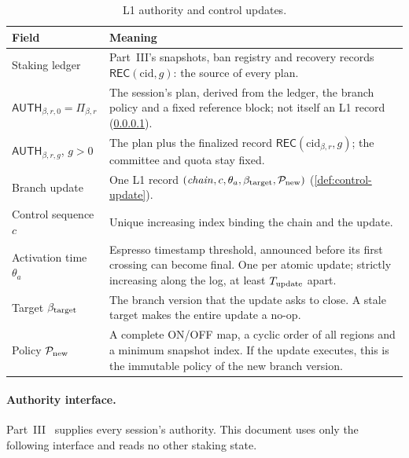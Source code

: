 \documentclass[11pt,a4paper]{article}
\newcommand{\tagg}[1]{\ensuremath{\mathsf{#1}}}
\begin{document}
\begin{table}[htbp]\centering\small
\caption{L1 authority and control updates.}\label{tab:l1}
\begin{tabularx}{\linewidth}{@{}p{.27\linewidth}Y@{}}\toprule
Field & Meaning\\\midrule
Staking ledger & Part~III's snapshots, ban registry and recovery records
$\tagg{REC}(\mathrm{cid},g)$: the source of every plan.\\
$\tagg{AUTH}_{\beta,r,0}=\Pi_{\beta,r}$ & The session's plan, derived from
the ledger, the branch policy and a fixed reference block; not itself an
L1 record (\cref{sec:authority-context}).\\
$\tagg{AUTH}_{\beta,r,g}$, $g>0$ & The plan plus the finalized record
$\tagg{REC}(\mathrm{cid}_{\beta,r},g)$; the committee and quota stay fixed.\\
Branch update & One L1 record
$(\mathit{chain},c,\theta_a,\beta_{\rm target},\mathcal P_{\rm new})$
(\cref{def:control-update}).\\
Control sequence $c$ & Unique increasing index binding the chain and the
update.\\
Activation time $\theta_a$ & Espresso timestamp threshold, announced
before its first crossing can become final. One per atomic update;
strictly increasing along the log, at least
$T_{\rm update}$ apart.\\
Target $\beta_{\rm target}$ & The branch version that the update asks to
close. A stale target makes the entire update a no-op.\\
Policy $\mathcal P_{\rm new}$ & A complete ON/OFF map, a cyclic order of
all regions and a minimum snapshot index. If the update executes, this
is the immutable policy of the new branch version.\\\bottomrule
\end{tabularx}
\end{table}

\paragraph{Authority interface.}
\label{sec:authority-context}
Part~III~\cite{part3} supplies every session's authority. This document
uses only the following interface and reads no other staking state.
\end{document}
